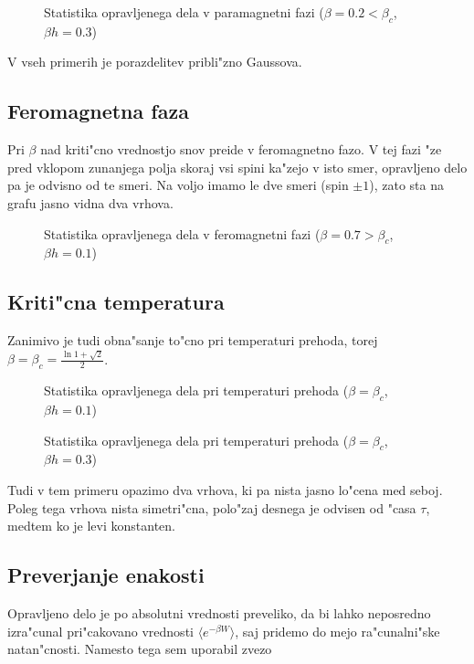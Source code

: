 \documentclass[a4paper,10pt]{article}
\begin{document}
\begin{figure}[h]
 
 \caption{Statistika opravljenega dela v paramagnetni fazi ($\beta = 0.2 < \beta_c$, $\beta h = 0.3$)}
\end{figure}

V vseh primerih je porazdelitev pribli"zno Gaussova. 

\subsection{Feromagnetna faza}

Pri $\beta$ nad kriti"cno vrednostjo snov preide v feromagnetno fazo. V tej fazi "ze pred vklopom zunanjega polja skoraj vsi spini ka"zejo v isto smer, opravljeno delo pa je odvisno od te smeri. Na voljo imamo le dve smeri (spin $\pm 1$), zato sta na grafu jasno vidna dva vrhova. 

\begin{figure}[h]
 
 \caption{Statistika opravljenega dela v feromagnetni fazi ($\beta = 0.7 > \beta_c$, $\beta h = 0.1$)}
\end{figure}

\subsection{Kriti"cna temperatura}

Zanimivo je tudi obna"sanje to"cno pri temperaturi prehoda, torej $\beta = \beta_c = \frac{\ln 1+\sqrt{2}}{2}$. 

\begin{figure}[h]
 
 \caption{Statistika opravljenega dela pri temperaturi prehoda ($\beta = \beta_c$, $\beta h = 0.1$)}
\end{figure}

\begin{figure}[h]
 
 \caption{Statistika opravljenega dela pri temperaturi prehoda ($\beta = \beta_c$, $\beta h = 0.3$)}
\end{figure}

Tudi v tem primeru opazimo dva vrhova, ki pa nista jasno lo"cena med seboj. Poleg tega vrhova nista simetri"cna, polo"zaj desnega je odvisen od "casa $\tau$, medtem ko je levi konstanten. 

\subsection{Preverjanje enakosti}

Opravljeno delo je po absolutni vrednosti preveliko, da bi lahko neposredno izra"cunal pri"cakovano vrednosti $\langle e^{-\beta W}\rangle$, saj pridemo do mejo ra"cunalni"ske natan"cnosti. Namesto tega sem uporabil zvezo
\end{document}
